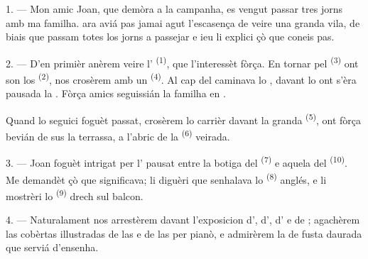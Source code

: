 %

\VUsaut{4.0mm}
\VUsaut{3.0mm}

\VUsaut{3.0mm}

1. --- Mon amic Joan, que demòra a la campanha, es vengut passar tres jorns amb
ma familha.  ara aviá pas jamai agut l'escasença de veire una granda
vila, de biais que passam totes los jorns a passejar e ieu li explici çò que
coneis pas.

2. --- D'en primièr anèrem veire l' \textsuperscript{(1)}, que
l'interessèt fòrça. En tornar pel  \textsuperscript{(3)} ont son
los  \textsuperscript{(2)}, nos crosèrem amb un
 \textsuperscript{(4)}. Al cap del 
caminava lo , davant lo  ont s'èra pausada la
. Fòrça amics seguissián la familha en .

Quand lo seguici foguèt passat, crosèrem lo carrièr davant la granda
 \textsuperscript{(5)}, ont fòrça  bevián de
 sus la terrassa, a l'abric de la 
\textsuperscript{(6)} veirada.

3. --- Joan foguèt intrigat per l' pausat entre la botiga
del  \textsuperscript{(7)} e aquela del
 \textsuperscript{(10)}. Me demandèt çò que significava;
li diguèri que senhalava lo  \textsuperscript{(8)} anglés, e li
mostrèri lo  \textsuperscript{(9)} drech sul balcon.

\VUsaut{3.0mm}

4. --- Naturalament nos arrestèrem davant l'exposicion d', d', d' e de ; agachèrem
las cobèrtas illustradas de las  e de las  per
pianò, e admirèrem la  de fusta daurada que serviá d'ensenha.

